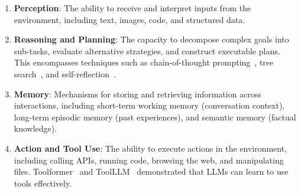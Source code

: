 \documentclass[11pt,a4paper]{article}
\begin{document}
\begin{enumerate}
    \item \textbf{Perception}: The ability to receive and interpret inputs from the environment, including text, images, code, and structured data.
    \item \textbf{Reasoning and Planning}: The capacity to decompose complex goals into sub-tasks, evaluate alternative strategies, and construct executable plans. This encompasses techniques such as chain-of-thought prompting~\citep{wei2022chain}, tree search~\citep{yao2024tree}, and self-reflection~\citep{shinn2024reflexion}.
    \item \textbf{Memory}: Mechanisms for storing and retrieving information across interactions, including short-term working memory (conversation context), long-term episodic memory (past experiences), and semantic memory (factual knowledge).
    \item \textbf{Action and Tool Use}: The ability to execute actions in the environment, including calling APIs, running code, browsing the web, and manipulating files. Toolformer~\citep{schick2024toolformer} and ToolLLM~\citep{qin2023toolllm} demonstrated that LLMs can learn to use tools effectively.
\end{enumerate}
\end{document}
